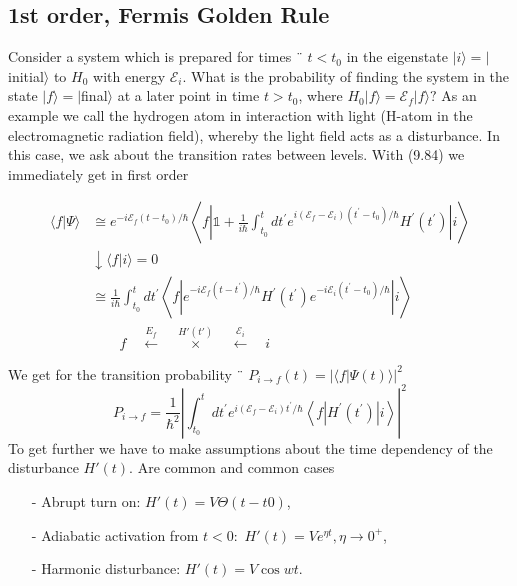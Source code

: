 \subsection{1st order, Fermis Golden Rule}
Consider a system which is prepared for times ¨ $t <t_0$ in the eigenstate $| i\rangle = | $initial$\rangle$ to $H_0$ with energy $\mathcal{E}_i$. What is the probability of finding the system in the state $| f\rangle = | $final$\rangle$ at a later point in time $t> t_0$, where $H_0 | f\rangle = \mathcal{E}_f | f\rangle?$ As an example we call the hydrogen atom in interaction with light (H-atom in the electromagnetic radiation field), whereby the light field acts as a disturbance. In this case, we ask about the transition rates between levels. With ({\color{red}9.84}) we immediately get in first order

\begin{align}\langle f | \Psi\rangle & \cong e^{-i \mathcal{E}_{f}\left(t-t_{0}\right) / \hbar}\left\langle f\left|\mathbb{1}+\frac{1}{i \hbar} \int_{t_{0}}^{t} d t^{\prime} e^{i\left(\mathcal{E}_{f}-\mathcal{E}_{i}\right)\left(t^{\prime}-t_{0}\right) / \hbar} H^{\prime}\left(t^{\prime}\right)\right| i\right\rangle \nonumber\\ & \downarrow\langle f | i\rangle= 0 \nonumber\\ & \cong \frac{1}{i \hbar} \int_{t_{0}}^{t} d t^{\prime}\left\langle f\left|e^{-i \mathcal{E}_{f}\left(t-t^{\prime}\right) / \hbar} H^{\prime}\left(t^{\prime}\right) e^{-i \mathcal{E}_{i}\left(t^{\prime}-t_{0}\right) / \hbar}\right| i\right\rangle \\ 
& \qquad f \quad \stackrel{E_{f}}{\longleftarrow} \quad \stackrel{H'(t')}{\times} \quad \stackrel{\mathcal{E}_{i}}{\longleftarrow} \quad i \end{align}

We get for the transition probability ¨ $P_{i \rightarrow f} (t) = | \langle f | \Psi (t) \rangle |^2$
\begin{equation}
    P_{i \rightarrow f}=\frac{1}{\hbar^{2}}\left|\int_{t_{0}}^{t} d t^{\prime} e^{i\left(\mathcal{E}_{f}-\mathcal{E}_{i}\right) t^{\prime} / \hbar}\left\langle f\left|H^{\prime}\left(t^{\prime}\right)\right| i\right\rangle\right|^{2}
    \end{equation}
To get further we have to make assumptions about the time dependency of the disturbance $H'(t)$. Are common and common cases
\begin{enumerate}
    \item[-] Abrupt turn on: $H'(t) = V\Theta (t - t0)$,
    \item[-] Adiabatic activation from $t <0:$ $H'(t) = V e^{\eta t}, \eta\rightarrow 0^+$, 
    \item[-] Harmonic disturbance: $H'(t) = V \operatorname{cos} wt$. 
\end{enumerate}

